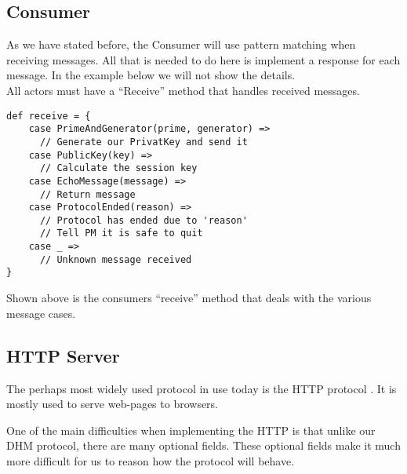\subsection{Consumer}
As we have stated before, the Consumer will use pattern matching when receiving messages. All that is needed to do here is implement a response for each message. In the example below we will not show the details. 
\\
All actors must have a ``Receive'' method that handles received messages. 
\begin{lstlisting}
def receive = {
    case PrimeAndGenerator(prime, generator) =>
      // Generate our PrivatKey and send it
    case PublicKey(key) =>
      // Calculate the session key
    case EchoMessage(message) =>
      // Return message
    case ProtocolEnded(reason) =>
      // Protocol has ended due to 'reason'
      // Tell PM it is safe to quit
    case _ =>
      // Unknown message received
}
\end{lstlisting}
Shown above is the consumers ``receive'' method that deals with the various message cases.

\subsection{HTTP Server}
The perhaps most widely used protocol in use today is the HTTP protocol \cite{fielding1999hypertext}. It is mostly used to serve web-pages to browsers.

One of the main difficulties when implementing the HTTP is that unlike our DHM protocol, there are many optional fields. These optional fields make it much more difficult for us to reason how the protocol will behave.  


















